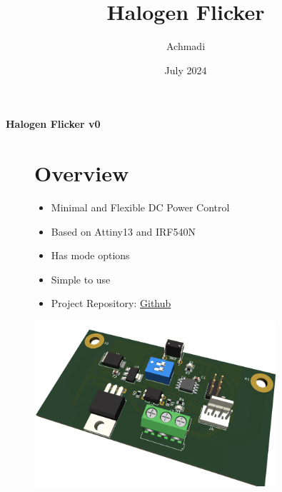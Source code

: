 \documentclass[a4paper,12pt,oneside,pdflatex,italian,final,twocolumn]{article}
\title{Halogen Flicker}
\author{Achmadi}
\date{July 2024}
\begin{document}
	\pagestyle{fancy}

	\chead{\today}

	\onecolumn
	\begin{figure}

	\end{figure}\begin{minipage}{0.47\textwidth}
		\centering

	\end{minipage}
	\hfill
	\begin{minipage}{0.47\textwidth}
		\raggedleft
		\Huge \textbf{Halogen Flicker v0}
	\end{minipage}

	\begin{figure}
		\begin{minipage}{0.47\textwidth}

			\section{Overview}
			\begin{itemize}
				\item Minimal and Flexible DC Power Control
				\item Based on Attiny13 and IRF540N
				\item Has mode options
				\item Simple to use
				\item Project Repository: \href{https://github.com/mekatronik-achmadi/short-jobs/tree/master/halogen-flicker}{Github}
			\end{itemize}

		\end{minipage}
		\hfill
		\begin{minipage}{0.47\textwidth}
			\centering
			\includegraphics[width=0.8\textwidth,right]{images/halodc_flicker_v0.png}
		\end{minipage}
	\end{figure}
\end{document}

